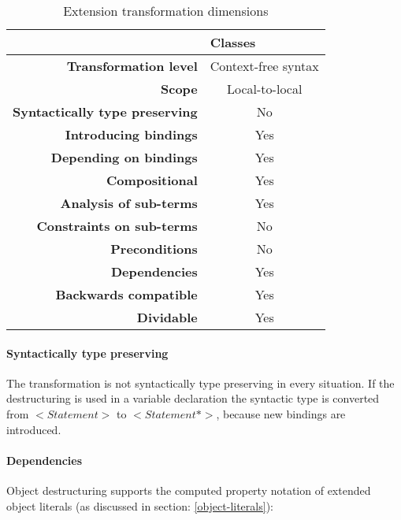 \documentclass[10pt,a4paper]{article}
\begin{document}
\begin{table}[h]
\centering
\caption{Extension transformation dimensions}
\label{destructuring-table}
\begin{tabular}{@{}rc@{}}
\toprule
                                       & \multicolumn{1}{l}{\textbf{Classes}} \\ \midrule
\textbf{Transformation level}          & Context-free syntax                          \\
\textbf{Scope}                         & Local-to-local                               \\
\textbf{Syntactically type preserving} & No                                          \\
\textbf{Introducing bindings}          & Yes                                          \\%
\textbf{Depending on bindings}         & Yes                                           \\
\textbf{Compositional}                 & Yes                                          \\
\textbf{Analysis of sub-terms}          & Yes                                          \\
\textbf{Constraints on sub-terms}       & No                                           \\
\textbf{Preconditions}                 & No                                          \\
\textbf{Dependencies}                  & Yes                                           \\
\textbf{Backwards compatible}          & Yes                                          \\
\textbf{Dividable}                     & Yes                                           \\ \bottomrule
\end{tabular}
\end{table}

\paragraph{Syntactically type preserving}
The transformation is not syntactically type preserving in every situation. If the destructuring is used in a variable declaration the syntactic type is converted from $<Statement>$ to $<Statement*>$, because new bindings are introduced.

\paragraph{Dependencies}
Object destructuring supports the computed property notation of extended object literals (as discussed in section: \ref{object-literals}): 
\end{document}
